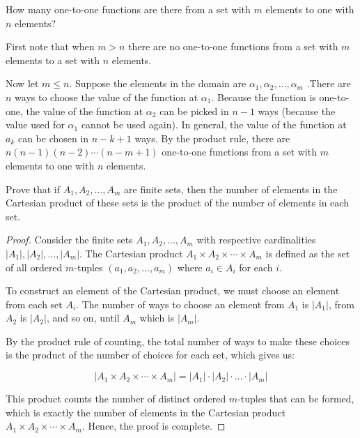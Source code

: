     \begin{exercise}
        How many one-to-one functions are there from a set with $m$ elements to one with $n$ elements?
    \end{exercise}
        \begin{solution}
            First note that when $m>n$ there are no one-to-one functions from a set with $m$ elements to a set with $n$ elements.
            
            Now let $m\leq n.$ Suppose the elements in the domain are $\alpha_1,\alpha_2,\ldots,\alpha_m$ .There are $n$ ways to choose the value of the function at $\alpha_1.$ 
            Because the function is one-to-one, the value of the function at $\alpha_{2}$ can be picked in $n-1$ ways (because the value used for $\alpha_{1}$ cannot be used again). 
            In general, the value of the function at $a_k$ can be chosen in $n-k+1$ ways. By the product rule, there are $n(n-1)(n-2)\cdots(n-m+1)$ one-to-one functions from a set 
            with $m$ elements to one with $n$ elements.
        \end{solution}

    \begin{exercise}
        Prove that if \( A_1, A_2, \ldots, A_m \) are finite sets, then the number of elements in the Cartesian product of these sets is the product of the number of elements in each set.
    \end{exercise}
        
        \begin{proof}
        Consider the finite sets \( A_1, A_2, \ldots, A_m \) with respective cardinalities \( |A_1|, |A_2|, \ldots, |A_m| \). The Cartesian product \( A_1 \times A_2 \times \cdots \times A_m \) is defined as the set of all ordered \( m \)-tuples \( (a_1, a_2, \ldots, a_m) \) where \( a_i \in A_i \) for each \( i \).
        
        To construct an element of the Cartesian product, we must choose an element from each set \( A_i \). The number of ways to choose an element from \( A_1 \) is \( |A_1| \), from \( A_2 \) is \( |A_2| \), and so on, until \( A_m \) which is \( |A_m| \).
        
        By the product rule of counting, the total number of ways to make these choices is the product of the number of choices for each set, which gives us:
        
        \[ |A_1 \times A_2 \times \cdots \times A_m| = |A_1| \cdot |A_2| \cdot \ldots \cdot |A_m| \]
        
        This product counts the number of distinct ordered \( m \)-tuples that can be formed, which is exactly the number of elements in the Cartesian product \( A_1 \times A_2 \times \cdots \times A_m \). Hence, the proof is complete.
        \end{proof}
    
